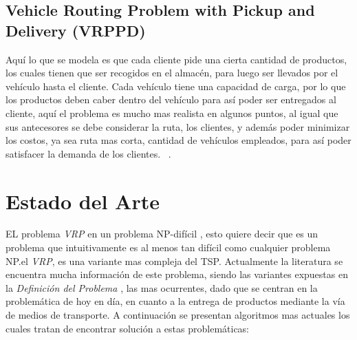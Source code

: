 \documentclass[letter, 10pt]{article}
\begin{document}
\subsection{Vehicle Routing Problem with Pickup and Delivery (VRPPD)}

Aqu\'i lo que se modela es que cada cliente pide una cierta cantidad de productos, los cuales tienen que ser recogidos en el almac\'en, para luego ser
llevados por el veh\'iculo hasta el cliente. Cada veh\'iculo tiene una capacidad de carga, por lo que los productos deben caber dentro del veh\'iculo
para as\'i poder ser entregados al cliente, aqu\'i el problema es mucho mas realista en algunos puntos, al igual que sus antecesores se debe considerar 
la ruta, los clientes, y adem\'as poder minimizar los costos, ya sea ruta mas corta, cantidad de veh\'iculos empleados, para as\'i poder satisfacer 
la demanda de los clientes.
~\cite{EilamTzoreff2002193}.

\section{Estado del Arte}

EL problema \emph{VRP} en un problema NP-dif\'icil , esto quiere decir que es un problema que intuitivamente es al menos tan dif\'icil como cualquier 
problema NP.el \emph{VRP}, es una variante mas compleja del TSP.
\newline
Actualmente la literatura se encuentra mucha informaci\'on de este problema, siendo las variantes expuestas en la \emph{Definici\'on del Problema }, 
las mas ocurrentes, dado que se centran en la problem\'atica de hoy en d\'ia, en cuanto a la entrega de productos mediante la v\'ia de 
medios de transporte.
A continuaci\'on se presentan algoritmos mas actuales los cuales tratan de encontrar soluci\'on a estas problem\'aticas:
\end{document}
